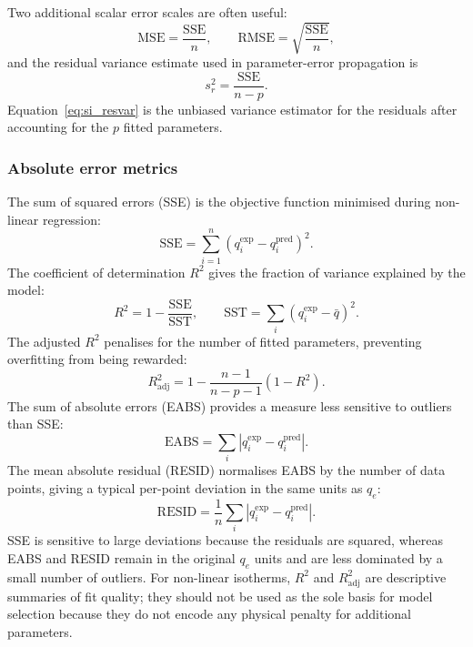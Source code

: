 \documentclass[journal=aamick,manuscript=article]{achemso}
\begin{document}
Two additional scalar error scales are often useful:
\begin{equation}
	\mathrm{MSE} = \frac{\mathrm{SSE}}{n},
	\qquad
	\mathrm{RMSE} = \sqrt{\frac{\mathrm{SSE}}{n}},
	\label{eq:si_MSE_RMSE}
\end{equation}
and the residual variance estimate used in parameter-error propagation is
\begin{equation}
	s_r^2 = \frac{\mathrm{SSE}}{n-p}.
	\label{eq:si_resvar}
\end{equation}
Equation~\eqref{eq:si_resvar} is the unbiased variance estimator for the
residuals after accounting for the $p$ fitted parameters.

\subsubsection{Absolute error metrics}

The sum of squared errors (SSE) is the objective function minimised
during non-linear regression:
\begin{equation}
	\text{SSE} = \sum_{i=1}^{n}(q_i^{\exp} - q_i^{\mathrm{pred}})^2.
	\label{eq:si_SSE}
\end{equation}
The coefficient of determination $R^2$ gives the fraction of variance
explained by the model:
\begin{equation}
	R^2 = 1 - \frac{\mathrm{SSE}}{\mathrm{SST}},
	\qquad \mathrm{SST} = \sum_{i}(q_i^{\exp} - \bar{q})^2.
	\label{eq:si_R2}
\end{equation}
The adjusted $R^2$ penalises for the number of fitted parameters,
preventing overfitting from being rewarded:
\begin{equation}
	R^2_{\mathrm{adj}} = 1 - \frac{n-1}{n-p-1}(1-R^2).
	\label{eq:si_R2adj}
\end{equation}
The sum of absolute errors (EABS) provides a measure less sensitive
to outliers than SSE:
\begin{equation}
	\text{EABS} = \sum_{i}|q_i^{\exp} - q_i^{\mathrm{pred}}|.
	\label{eq:si_EABS}
\end{equation}
The mean absolute residual (RESID) normalises EABS by the number of
data points, giving a typical per-point deviation in the same units
as $q_e$:
\begin{equation}
	\text{RESID} = \frac{1}{n}\sum_{i}|q_i^{\exp} - q_i^{\mathrm{pred}}|.
	\label{eq:si_RESID}
\end{equation}
SSE is sensitive to large deviations because the residuals are squared,
whereas EABS and RESID remain in the original $q_e$ units and are less
dominated by a small number of outliers. For non-linear isotherms,
$R^2$ and $R^2_{\mathrm{adj}}$ are descriptive summaries of fit quality;
they should not be used as the sole basis for model selection because
they do not encode any physical penalty for additional parameters.
\end{document}
